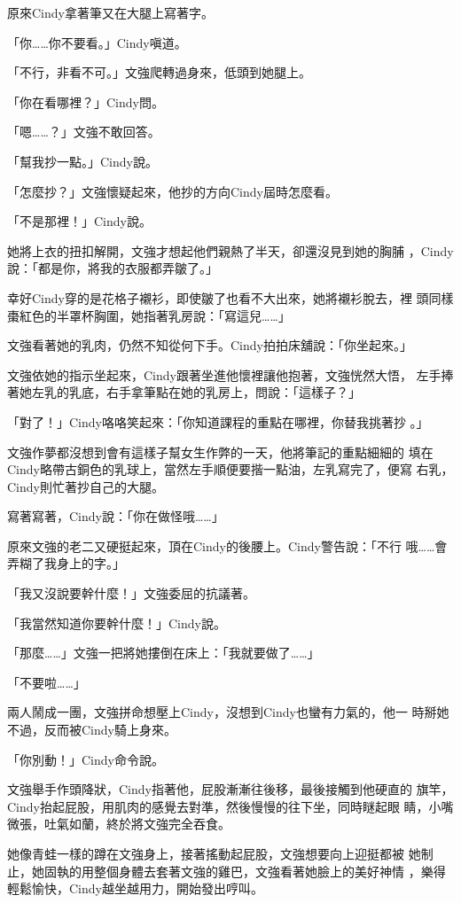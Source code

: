 原來Cindy拿著筆又在大腿上寫著字。

「你……你不要看。」Cindy嗔道。

「不行，非看不可。」文強爬轉過身來，低頭到她腿上。

「你在看哪裡？」Cindy問。

「嗯……？」文強不敢回答。

「幫我抄一點。」Cindy說。

「怎麼抄？」文強懷疑起來，他抄的方向Cindy屆時怎麼看。

「不是那裡！」Cindy說。

她將上衣的扭扣解開，文強才想起他們親熱了半天，卻還沒見到她的胸脯
，Cindy說：「都是你，將我的衣服都弄皺了。」

幸好Cindy穿的是花格子襯衫，即使皺了也看不大出來，她將襯衫脫去，裡
頭同樣棗紅色的半罩杯胸圍，她指著乳房說：「寫這兒……」

文強看著她的乳肉，仍然不知從何下手。Cindy拍拍床舖說：「你坐起來。」

文強依她的指示坐起來，Cindy跟著坐進他懷裡讓他抱著，文強恍然大悟，
左手捧著她左乳的乳底，右手拿筆點在她的乳房上，問說：「這樣子？」

「對了！」Cindy咯咯笑起來：「你知道課程的重點在哪裡，你替我挑著抄
。」

文強作夢都沒想到會有這樣子幫女生作弊的一天，他將筆記的重點細細的
填在Cindy略帶古銅色的乳球上，當然左手順便要揩一點油，左乳寫完了，便寫
右乳，Cindy則忙著抄自己的大腿。

寫著寫著，Cindy說：「你在做怪哦……」

原來文強的老二又硬挺起來，頂在Cindy的後腰上。Cindy警告說：「不行
哦……會弄糊了我身上的字。」

「我又沒說要幹什麼！」文強委屈的抗議著。

「我當然知道你要幹什麼！」Cindy說。

「那麼……」文強一把將她摟倒在床上：「我就要做了……」

「不要啦……」

兩人鬧成一團，文強拼命想壓上Cindy，沒想到Cindy也蠻有力氣的，他一
時掰她不過，反而被Cindy騎上身來。

「你別動！」Cindy命令說。

文強舉手作頭降狀，Cindy指著他，屁股漸漸往後移，最後接觸到他硬直的
旗竿，Cindy抬起屁股，用肌肉的感覺去對準，然後慢慢的往下坐，同時瞇起眼
睛，小嘴微張，吐氣如蘭，終於將文強完全吞食。

她像青蛙一樣的蹲在文強身上，接著搖動起屁股，文強想要向上迎挺都被
她制止，她固執的用整個身體去套著文強的雞巴，文強看著她臉上的美好神情
，樂得輕鬆愉快，Cindy越坐越用力，開始發出哼叫。

